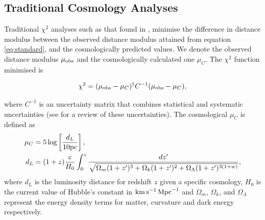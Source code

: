 \documentclass[a4paper,fleqn,usenatbib]{mnras}
\newcommand{\green}{\color{forestgreen}}
\newcommand{\kmsmpc}{{\rm km}\,{\rm s}^{-1}\,{\rm Mpc}^{-1}}
\begin{document}
\subsection{Traditional Cosmology Analyses} \label{sec:traditional}

Traditional $\chi^2$ analyses such as that found in \citet{Riess1998, Perlmutter1999, Wood-Vasey2007, Kowalski2008, Kessler2009, Conley2011, Betoule2014}, minimise the difference in distance modulus between the observed distance modulus attained from equation \ref{eq:standard}, and the cosmologically predicted values. We denote the observed distance modulus $\mu_{\rm obs}$ and the cosmologically calculated one $\mu_C$. {\green The $\chi^2$ function minimised is}

\begin{align}
\chi^2 = (\mu_{\rm obs} - \mu_C)^\dagger C^{-1} (\mu_{\rm obs} - \mu_C),
\end{align}

where $C^{-1}$ is an uncertainty matrix that combines statistical and systematic uncertainties (see \citet{Brout18SYS} for a review of these uncertainties). The cosmological $\mu_C$ is defined as
{\green 
\begin{align}
\mu_C &= 5 \log\left[ \frac{d_L}{10{\rm pc}} \right], \label{eq:mu0}\\
d_L& = (1+z)\frac{c}{H_0} \int_0^z \frac{dz'}{\sqrt{ \Omega_m (1+z')^3 + \Omega_k (1 + z')^2 + \Omega_\Lambda (1+z')^{3(1+w)}}},
\end{align}
}
where $d_L$ is the luminosity distance for redshift $z$ given a specific cosmology, $H_0$ is the current value of Hubble's constant in $\kmsmpc$ and $\Omega_m$, $\Omega_k$, and $\Omega_\Lambda$ represent the energy density terms for matter, curvature and dark energy respectively.
\end{document}
